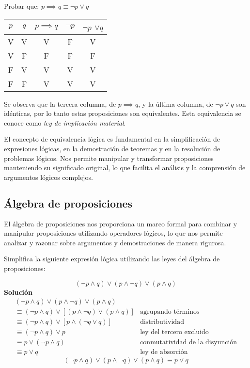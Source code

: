 \begin{fmd-example}
	Probar que: \( p \implies q \equiv \neg p \lor q \)

\begin{table}[H]
	\centering
	\begin{tabular}{|c|c|c|c|c|}
		\hline
		$p$ & $q$ & $p \implies q$ & $\neg p$ & $\neg p$ $\lor q$ \\
		\hline
		V & V & V & F & V \\
		V & F & F & F & F \\
		F & V & V & V & V \\
		F & F & V & V & V \\
		\hline
	\end{tabular}
\end{table}
	Se observa que la tercera columna, de $p \implies q$, y la última columna, de \( \neg p \lor q \) son idénticas, por lo tanto estas proposiciones son equivalentes. Esta equivalencia se conoce como \textit{ley de implicación material}.
	\label{ex:implicacion}
\end{fmd-example}

El concepto de equivalencia lógica es fundamental en la simplificación de expresiones lógicas, en la demostración de teoremas y en la resolución de problemas lógicos. Nos permite manipular y transformar proposiciones manteniendo su significado original, lo que facilita el análisis y la comprensión de argumentos lógicos complejos.

\subsection{Álgebra de proposiciones}

El álgebra de proposiciones nos proporciona un marco formal para combinar y manipular proposiciones utilizando operadores lógicos, lo que nos permite analizar y razonar sobre argumentos y demostraciones de manera rigurosa.

\begin{fmd-example}
	Simplifica la siguiente expresión lógica utilizando las leyes del álgebra de proposiciones:
	
	\[
	(\neg p \land q) \lor (p \land \neg q) \lor (p \land q)
	\]
	\textbf{Solución}
	\[ \begin{array}{ll}
		(\neg p \land q) \lor (p \land \neg q) \lor (p \land q) & \\
		\equiv (\neg p \land q) \lor [(p \land \neg q) \lor (p \land q)] & \mbox{agrupando términos}\\
		\equiv (\neg p \land q) \lor [p \land (\neg q \lor q)] & \mbox{distributividad}\\
		\equiv (\neg p \land q) \lor p & \mbox{ley del tercero excluido}\\
		\equiv p \lor (\neg p \land q) & \mbox{conmutatividad de la disyunción}\\
		\equiv p \lor q & \mbox{ley de absorción}
		\end{array} \]
\[ (\neg p \land q) \lor (p \land \neg q) \lor (p \land q) \equiv p \lor q \]
\end{fmd-example}

